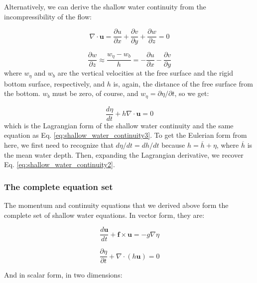 \documentclass[12pt]{article}
\numberwithin{equation}{section}
\numberwithin{figure}{section}
\numberwithin{table}{section}
\begin{document}
Alternatively, we can derive the shallow water continuity from the incompressibility
of the flow:

\begin{equation}
  \nabla \cdot \mathbf{u} = 
  \frac{\partial u}{\partial x} + 
  \frac{\partial v}{\partial y} + 
  \frac{\partial w}{\partial z} = 0
\end{equation}

\begin{equation}
  \frac{\partial w}{\partial z} \approx \frac{w_\eta - w_b}{h} = - \frac{\partial u}{\partial x} - \frac{\partial v}{\partial y}
\end{equation}
where $w_\eta$ and $w_b$ are the vertical velocities at the free surface and the
rigid bottom surface, respectively, and $h$ is, again, the distance of the free
surface from the bottom.
$w_b$ must be zero, of course, and $w_\eta = \partial \eta / \partial t$,
so we get:

\begin{equation}
  \frac{d \eta}{dt} + h \nabla \cdot \mathbf{u} = 0
\end{equation}
which is the Lagrangian form of the shallow water continuity and the same
equation as Eq. \ref{eq:shallow_water_continuity3}.
To get the Eulerian form from here, we first need to recognize that
$d\eta/dt = dh/dt$ because $h = \overline{h} + \eta$, where $\overline{h}$ is the
mean water depth.
Then, expanding the Lagrangian derivative, we recover Eq.
\ref{eq:shallow_water_continuity2}.

\subsubsection{The complete equation set}

The momentum and continuity equations that we derived above form the complete
set of shallow water equations.
In vector form, they are:

\begin{equation}
  \frac{d \mathbf{u}}{dt} + \mathbf{f} \times \mathbf{u} =
  - g \nabla \eta
  \label{eq:shallow_water_final_momentum}
\end{equation}

\begin{equation}
  \frac{\partial \eta}{\partial t} + \nabla \cdot (h \mathbf{u}) = 0
  \label{eq:shallow_water_final_continuity}
\end{equation}

And in scalar form, in two dimensions:
\end{document}
